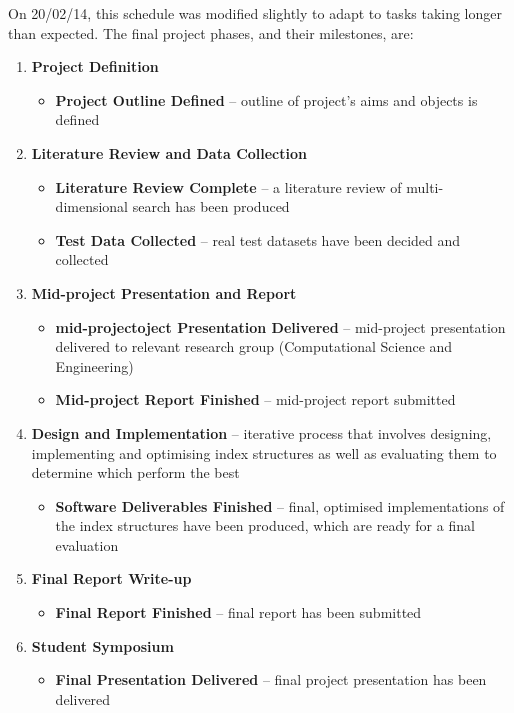 On 20/02/14, this schedule was modified slightly to adapt to tasks taking longer than expected. The final project phases, and their milestones, are:
\begin{enumerate}
	\item \textbf{Project Definition}
	\begin{itemize}
		\item \textbf{Project Outline Defined} -- outline of project's aims and objects is defined 
	\end{itemize}
	\item \textbf{Literature Review and Data Collection}
	\begin{itemize}	
		\item \textbf{Literature Review Complete} -- a literature review of multi-dimensional search has been produced
		\item \textbf{Test Data Collected} -- real test datasets have been decided and collected
	\end{itemize}
	\item \textbf{Mid-project Presentation and Report}
	\begin{itemize}	
		\item \textbf{mid-projectoject Presentation Delivered} -- mid-project presentation delivered to relevant research group (Computational Science and Engineering)
		\item \textbf{Mid-project Report Finished} --  mid-project report submitted
	\end{itemize}	

	\vspace{60pt}

	\item \textbf{Design and Implementation} -- iterative process that involves designing, implementing and optimising index structures as well as evaluating them to determine which perform the best
	\begin{itemize}
		\item \textbf{Software Deliverables Finished} -- final, optimised implementations of the index structures have been produced, which are ready for a final evaluation
	\end{itemize}
	\item \textbf{Final Report Write-up}
	\begin{itemize}
		\item \textbf{Final Report Finished} -- final report has been submitted
	\end{itemize}
	\item \textbf{Student Symposium}
	\begin{itemize}
		\item \textbf{Final Presentation Delivered} -- final project presentation has been delivered 
	\end{itemize}
\end{enumerate}

